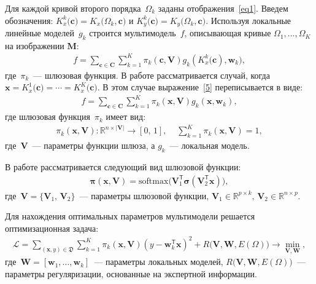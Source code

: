 \documentclass[12pt]{a&t}
\begin{document}
Для каждой кривой второго порядка~$\Omega_k$ заданы отображения~\eqref{eq1}. Введем обозначения: $K_x^k\bigr(\mathbf{c}\bigr) = K_x\bigr(\Omega_k, \mathbf{c}\bigr)$ и $K_y^k\bigr(\mathbf{c}\bigr) = K_y\bigr(\Omega_k, \mathbf{c}\bigr)$. Используя локальные линейные моделей~$g_k$ строится мультимодель~$f$, описывающая кривые $\Omega_1, \dots, \Omega_K$ на изображении $\mathbf{M}$:
\begin{gather}
\label{5}
	f = \sum\limits_{\mathbf{c} \in \mathbf{C}} \sum_{k = 1}^{K} \pi_k(\mathbf{c}, \mathbf{V})g_k(K^k_{x}\bigl(\mathbf{c}), \mathbf{w}_k), 
\end{gather}
где~$\pi_k$~--- шлюзовая функция. В работе рассматривается случай, когда~$\mathbf{x}=K^1_{x}\bigl(\mathbf{c})=\cdots=K^K_{x}\bigl(\mathbf{ c}).$ В этом случае выражение~\eqref{5} переписывается в виде:
\begin{gather}
\label{5_1}
	f = \sum\limits_{\mathbf{c} \in \mathbf{C}} \sum_{k = 1}^{K} \pi_k(\mathbf{x}, \mathbf{V})g_k(\mathbf{x}, \mathbf{w}_k), 
\end{gather}
где шлюзовая функция~$\pi_k$ имеет вид:
\begin{gather}
\label{6}
	\pi_k(\mathbf{x}, \mathbf{V}): \mathbb{R}^{n\times |\mathbf{V}|} \rightarrow [0, \, 1], \; \; \; \; \sum\limits_{k = 1}^{K}\pi_k(\mathbf{x}, \mathbf{V}) = 1,
\end{gather}
где~$\mathbf{V}$~--- параметры функции шлюза, а $g_k$~--- локальная модель.

В работе рассматривается следующий вид шлюзовой функции:
\begin{gather}
    \boldsymbol{\pi}(\mathbf{x}, \mathbf{V}) = \text{softmax}\bigl(\mathbf{V}_1^{\mathsf{T}}\boldsymbol{\sigma}(\mathbf{V}_2^{\mathsf{T}}\mathbf{x}) \bigr),
\end{gather}
где~$\mathbf{V} = \{\mathbf{V}_1, \, \mathbf{V}_2\}$~--- параметры шлюзовой функции, $\mathbf{V}_1 \in \mathbb{R}^{p \times k}, \, \mathbf{V}_2 \in \mathbb{R}^{n \times p}$.

Для нахождения оптимальных параметров мультимодели решается оптимизационная задача:
\begin{gather}
\label{9}
\mathcal{L} = \sum\limits_{(\mathbf{x}, y) \in \mathfrak{D}} \sum\limits_{k = 1}^{K} \pi_k(\mathbf{x}, \mathbf{V})(y - \mathbf{w}_k^{\mathsf{T}}\mathbf{x})^2 + R\bigl(\mathbf{V}, \mathbf{W}, E(\Omega)\bigr) \rightarrow \min_{\mathbf{V}, \mathbf{W}},
\end{gather}
где~$\mathbf{W} = [\mathbf{w}_1, \dots, \mathbf{w}_k]$~--- параметры локальных моделей, $R\bigl(\mathbf{V}, \mathbf{W}, E(\Omega)\bigr)$~--- параметры регуляризации, основанные на экспертной информации.
\end{document}
